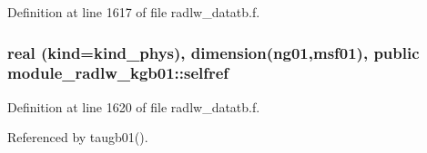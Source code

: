 Definition at line 1617 of file radlw\+\_\+datatb.\+f.

\subsubsection[{\texorpdfstring{selfref}{selfref}}]{\setlength{\rightskip}{0pt plus 5cm}real (kind=kind\+\_\+phys), dimension(ng01,{\bf msf01}), public module\+\_\+radlw\+\_\+kgb01\+::selfref}\hypertarget{namespacemodule__radlw__kgb01_a14c7cc68b26c0ab1fdfda6faa2d485d5}{}\label{namespacemodule__radlw__kgb01_a14c7cc68b26c0ab1fdfda6faa2d485d5}


Definition at line 1620 of file radlw\+\_\+datatb.\+f.



Referenced by taugb01().

